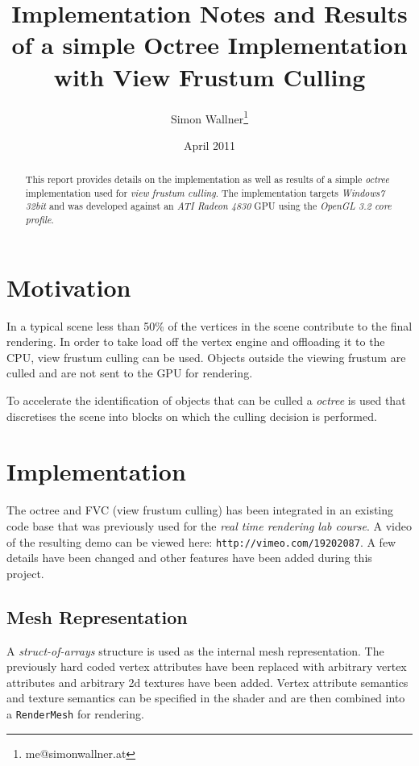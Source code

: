 \documentclass[a4, 12pt]{scrartcl}
\begin{document}
\title{Implementation Notes and Results of a simple Octree Implementation with View Frustum Culling}
\author{Simon Wallner\footnote{me@simonwallner.at}}
\date{April 2011}
\maketitle

\begin{abstract}
This report provides details on the implementation as well as results of a simple \emph{octree} implementation used for \emph{view frustum culling}. The implementation targets \emph{Windows7 32bit} and was developed against an \emph{ATI Radeon 4830} GPU using the \emph{OpenGL 3.2 core profile}.
\end{abstract}

\section{Motivation}
In a typical scene less than 50\% of the vertices in the scene contribute to the final rendering. In order to take load off the vertex engine and offloading it to the CPU, view frustum culling can be used. Objects outside the viewing frustum are culled and are not sent to the GPU for rendering.

To accelerate the identification of objects that can be culled a \emph{octree} is used that discretises the scene into blocks on which the culling decision is performed.

\section{Implementation}
The octree and FVC (view frustum culling) has been integrated in an existing code base that was previously used for the \emph{real time rendering lab course}. A video of the resulting demo can be viewed here: \texttt{http://vimeo.com/19202087}. A few details have been changed and other features have been added during this project.

\subsection{Mesh Representation}
A \emph{struct-of-arrays} structure is used as the internal mesh representation. The previously hard coded vertex attributes have been replaced with arbitrary vertex attributes and arbitrary 2d textures have been added. Vertex attribute semantics and texture semantics can be specified in the shader and are then combined into a \texttt{RenderMesh} for rendering.
\end{document}
